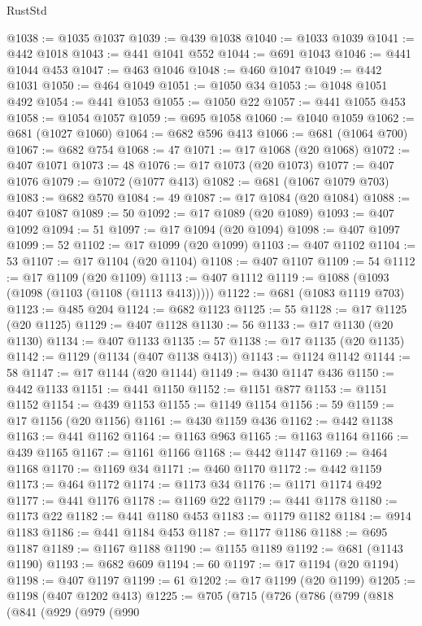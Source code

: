 \begin{lexlean}{RustStd}
\begin{coremodule}
@1038 := @1035 @1037
@1039 := @439 @1038
@1040 := @1033 @1039
@1041 := @442 @1018
@1043 := @441 @1041 @552
@1044 := @691 @1043
@1046 := @441 @1044 @453
@1047 := @463 @1046
@1048 := @460 @1047
@1049 := @442 @1031
@1050 := @464 @1049
@1051 := @1050 @34
@1053 := @1048 @1051 @492
@1054 := @441 @1053
@1055 := @1050 @22
@1057 := @441 @1055 @453
@1058 := @1054 @1057
@1059 := @695 @1058
@1060 := @1040 @1059
@1062 := @681 (@1027 @1060)
@1064 := @682 @596 @413
@1066 := @681 (@1064 @700)
@1067 := @682 @754
@1068 := 47
@1071 := @17 @1068 (@20 @1068)
@1072 := @407 @1071
@1073 := 48
@1076 := @17 @1073 (@20 @1073)
@1077 := @407 @1076
@1079 := @1072 (@1077 @413)
@1082 := @681 (@1067 @1079 @703)
@1083 := @682 @570
@1084 := 49
@1087 := @17 @1084 (@20 @1084)
@1088 := @407 @1087
@1089 := 50
@1092 := @17 @1089 (@20 @1089)
@1093 := @407 @1092
@1094 := 51
@1097 := @17 @1094 (@20 @1094)
@1098 := @407 @1097
@1099 := 52
@1102 := @17 @1099 (@20 @1099)
@1103 := @407 @1102
@1104 := 53
@1107 := @17 @1104 (@20 @1104)
@1108 := @407 @1107
@1109 := 54
@1112 := @17 @1109 (@20 @1109)
@1113 := @407 @1112
@1119 := @1088 (@1093 (@1098 (@1103 (@1108 (@1113 @413)))))
@1122 := @681 (@1083 @1119 @703)
@1123 := @485 @204
@1124 := @682 @1123
@1125 := 55
@1128 := @17 @1125 (@20 @1125)
@1129 := @407 @1128
@1130 := 56
@1133 := @17 @1130 (@20 @1130)
@1134 := @407 @1133
@1135 := 57
@1138 := @17 @1135 (@20 @1135)
@1142 := @1129 (@1134 (@407 @1138 @413))
@1143 := @1124 @1142
@1144 := 58
@1147 := @17 @1144 (@20 @1144)
@1149 := @430 @1147 @436
@1150 := @442 @1133
@1151 := @441 @1150
@1152 := @1151 @877
@1153 := @1151 @1152
@1154 := @439 @1153
@1155 := @1149 @1154
@1156 := 59
@1159 := @17 @1156 (@20 @1156)
@1161 := @430 @1159 @436
@1162 := @442 @1138
@1163 := @441 @1162
@1164 := @1163 @963
@1165 := @1163 @1164
@1166 := @439 @1165
@1167 := @1161 @1166
@1168 := @442 @1147
@1169 := @464 @1168
@1170 := @1169 @34
@1171 := @460 @1170
@1172 := @442 @1159
@1173 := @464 @1172
@1174 := @1173 @34
@1176 := @1171 @1174 @492
@1177 := @441 @1176
@1178 := @1169 @22
@1179 := @441 @1178
@1180 := @1173 @22
@1182 := @441 @1180 @453
@1183 := @1179 @1182
@1184 := @914 @1183
@1186 := @441 @1184 @453
@1187 := @1177 @1186
@1188 := @695 @1187
@1189 := @1167 @1188
@1190 := @1155 @1189
@1192 := @681 (@1143 @1190)
@1193 := @682 @609
@1194 := 60
@1197 := @17 @1194 (@20 @1194)
@1198 := @407 @1197
@1199 := 61
@1202 := @17 @1199 (@20 @1199)
@1205 := @1198 (@407 @1202 @413)
@1225 := @705
    (@715
      (@726
        (@786
          (@799
            (@818
              (@841
                (@929
                  (@979
                    (@990

\end{coremodule}
\end{lexlean}
